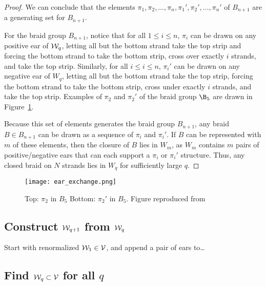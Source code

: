 \documentclass[paper.tex]{subfiles}
\begin{document}
\begin{proof}
    We can conclude that the elements $\pi_1, \pi_2, \dots, \pi_n, \pi_1', \pi_2', \dots, \pi_n'$ of $B_{n+1}$ are a generating set for $B_{n+1}$. 


    For the braid group $B_{n+1}$, notice that for all $1 \leq i \leq n$, $\pi_i$ can be drawn on any positive ear of $\mathcal{W}_q$, letting all but the bottom strand take the top strip and forcing the bottom strand to take the bottom strip, cross over exactly $i$ strands, and take the top strip. Similarly, for all $i \leq i \leq n$, $\pi_i'$ can be drawn on any negative ear of $W_q$, letting all but the bottom strand take the top strip, forcing the bottom strand to take the bottom strip, cross under exactly $i$ strands, and take the top strip. Examples of $\pi_2$ and $\pi_2'$ of the braid group $\B_5$ are drawn in Figure~\ref{fig:earexchange}. 

    Because this set of elements generates the braid group $B_{n+1}$, any braid $B \in B_{n+1}$ can be drawn as a sequence of $\pi_i$ and $\pi_i'$. If $B$ can be represented with $m$ of these elements, then the closure of $B$ lies in $W_m$, as $W_m$ contains $m$ pairs of positive/negative ears that can each support a $\pi_i$ or $\pi_i'$ structure. Thus, any closed braid on $N$ strands lies in $W_q$ for sufficiently large $q$. 

\end{proof}



\begin{figure}[h]
  \centering
  \texttt{[image: ear\_exchange.png]}
  \caption{Top: $\pi_2$ in $B_5$ Bottom: $\pi_2'$ in $B_5$. Figure reproduced from~\cite{Ghrist1996}}\label{fig:earexchange}
\end{figure}




\subsection{Construct $\mathcal{W}_{q+1}$ from $\mathcal{W}_q$}

Start with renormalized $\mathcal{W}_1 \in \mathcal{V}$, and append a pair of ears to\dots


\subsection{Find $\mathcal{W}_q \subset \mathcal{V}$ for all $q$}
\end{document}
